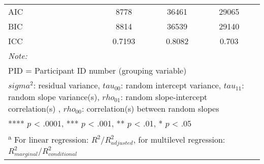 \begin{landscape}
\begin{table}
\begin{minipage}[t][\textheight][t]{\textwidth}
{\begin{tabular}[t]{lcccccccccccc}
AIC &  &  &  &  &  &  & 8778 &  & 36461 &  & 29065 & \\
BIC &  &  &  &  &  &  & 8814 &  & 36539 &  & 29140 & \\
ICC &  &  &  &  &  &  & 0.7193 &  & 0.8082 &  & 0.703 & \\
\bottomrule
\multicolumn{13}{l}{\rule{0pt}{1em}\textit{Note: }}\\
\multicolumn{13}{l}{\rule{0pt}{1em}PID = Participant ID number (grouping variable)}\\
\multicolumn{13}{l}{\rule{0pt}{1em}$sigma^2$: residual variance, $tau_{00}$: random intercept variance, $tau_{11}$: random slope variance(s), $rho_{01}$: random slope-intercept correlation(s) , $rho_{00}$: correlation(s) between random slopes}\\
\multicolumn{13}{l}{\rule{0pt}{1em}**** $p$ < .0001, *** $p$ < .001, ** $p$ < .01, * $p$ < .05}\\
\multicolumn{13}{l}{\rule{0pt}{1em}\textsuperscript{a} For linear regression: $R^2 / R^2_{adjusted}$, for multilevel regression: $R^2_{marginal} / R^2_{conditional}$ }\\
\end{tabular}}
\end{minipage}
\end{table}
\end{landscape}
